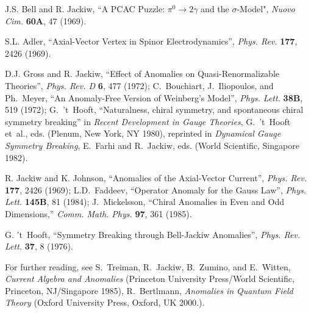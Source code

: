 \documentclass[a4paper,12pt,twoside]{article}
\begin{document}
\begin{thebibliography}{99}

\def\Journal#1#2#3#4{{\em #1} {\bf #2}, #3 (#4)}
\def\add#1#2#3{{\bf #1}, #2 (#3)}
\def\Book#1#2#3#4{{\em #1}  (#2, #3 #4)}
\def\Bookeds#1#2#3#4#5{{\em #1}, #2  (#3, #4 #5)}

\def\NPB{Nucl. Phys.} %
\def\PLA{Phys. Lett.} %
\def\PLB{Phys. Lett.} %
\def\PRL{Phys. Rev. Lett.}
\def\PRD{Phys. Rev. D}
\def\PR{Phys. Rev.}
\def\ZPC{Z. Phys. C}
\def\SJNP{Sov. J. Nucl. Phys.}
\def\AnnP{Ann. Phys.\ ({\em NY})}
\def\JETPL{JETP Lett.}
\def\LMP{Lett. Math. Phys.}
\def\CMP{Comm. Math. Phys.}
\def\PTP{Prog. Theor. Phys.}
\def\PNAS{Proc. Nat. Acad. Sci.}

J.S. Bell and R. Jackiw, ``A PCAC Puzzle: $\pi^0\to 2\gamma$ and the
$\sigma$-Model", \Journal{Nuovo Cim.}{60A}{47}{1969}.

S.L. Adler, ``Axial-Vector Vertex in Spinor Electrodynamics'', 
\Journal{\PR}{177}{2426}{1969}.

D.J. Gross and R. Jackiw, ``Effect of Anomalies on Quasi-Renormalizable Theories'', 
\Journal{\PRD}{6}{477}{1972};  C.~Bouchiart, J.~Iliopoulos, and Ph.~Meyer, ``An
Anomaly-Free Version of Weinberg's Model'', \Journal{\PLA}{38B}{519}{1972}; 
G.~'t~Hooft, ``Naturalness, chiral symmetry, and spontaneous chiral symmetry
breaking'' in \Bookeds{Recent Development in Gauge Theories}{G.~'t~Hooft et~al.,
eds.}{Plenum}{New York, NY}{1980}, reprinted in  
\Bookeds{Dynamical Gauge Symmetry Breaking}{E.~Farhi and R.~Jackiw,
eds.}{World Scientific}{Singapore}{1982}.

R. Jackiw and K. Johnson, ``Anomalies of the Axial-Vector Current'',
\Journal{\PR}{177}{2426}{1969}; 
L.D.~Faddeev, ``Operator Anomaly for the Gauss Law'',
\Journal{\PLB}{145B}{81}{1984};
J.~Mickelsson, ``Chiral Anomalies in Even and Odd Dimensions,''
\Journal{\CMP}{97}{361}{1985}.

G. 't~Hooft, ``Symmetry Breaking through Bell-Jackiw Anomalies'',
\Journal{\PRL}{37}{8}{1976}.

For further reading, see S.~Treiman, R.~Jackiw, B.~Zumino, and E.~Witten,
\Book{Current Algebra and Anomalies}{Princeton University Press/World
Scientific}{Princeton, NJ/Singapore}{1985}, R.~Bertlmann, \Book{Anomalies in
Quantum Field Theory}{Oxford University Press}{Oxford, UK}{2000.}. 

\end{thebibliography}
\end{document}
